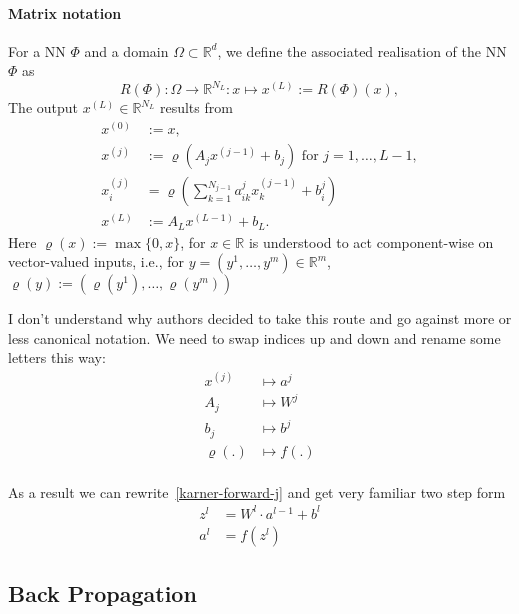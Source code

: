\documentclass[draft]{article}
\def\RealSet{\mathbb{R}}
\begin{document}
\paragraph{Matrix notation}
For a NN $\Phi$ and a domain $\Omega\subset\RealSet^d$, we define the associated realisation of the NN $\Phi$ as
\[
R(\Phi) \colon \Omega \rightarrow \RealSet^{N_L} \colon x \mapsto x^{(L)}:=R(\Phi)(x),
\]
The output $x^{(L)}\in \RealSet^{N_L}$ results from
\begin{align}
x^{(0)} &:= x,\\
x^{(j)} &:= \varrho(A_j x^{(j-1)} + b_j) \text{ for $j=1,\dots,L-1$}, \label{karner-forward-j}\\
x^{(j)}_i &= \varrho(\sum_{k=1}^{N_{j-1}} a^j_{ik}x^{(j-1)}_k + b^j_i) \\
x^{(L)} &:= A_L x^{(L-1)} + b_L.
\end{align}
Here $\varrho(x) := \max \{0,x\}$, for $x\in\RealSet$ is understood to act component-wise on vector-valued inputs, i.e., for $y=(y^1,\dots,y^m)\in\RealSet^m$, $\varrho(y) := (\varrho(y^1),\dots,\varrho(y^m))$

I don't understand why authors decided to take this route and go against more or less canonical notation. We need to swap indices up and down and rename some letters this way:
\begin{align}
x^{(j)} &\mapsto a^j \\
A_j &\mapsto W^j \\
b_j &\mapsto b^j \\
\varrho(.) &\mapsto f(.) \\
\end{align}

As a result we can rewrite~\eqref{karner-forward-j} and get very familiar two step form
\begin{align}
z^l &= W^l \cdot a^{l-1} + b^l \\
a^l &= f(z^l)
\end{align}


\subsection{Back Propagation}
\end{document}
